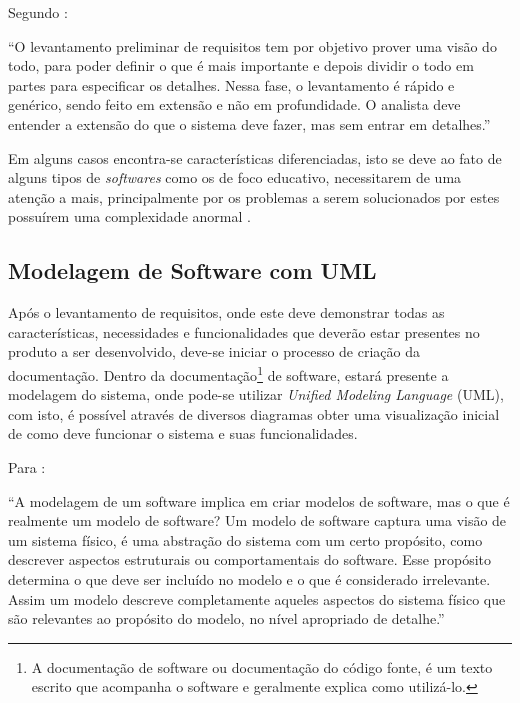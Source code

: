 \documentclass[
	12pt,				%
    oneside,			%
	a4paper,			%
	english,			%
	french,				%
	spanish,			%
	brazil,				%
	]{abntex2}
\begin{document}
	Segundo :
	
	\begin{citacao}
		“O levantamento preliminar de requisitos tem por objetivo prover uma visão do todo, para poder definir o que é mais importante e depois dividir o todo em partes para especificar os detalhes. Nessa fase, o levantamento é rápido e genérico, sendo feito em extensão e não em profundidade. O analista deve entender a extensão do que o sistema deve fazer, mas sem entrar em detalhes.”
	\end{citacao}
	
	Em alguns casos encontra-se características diferenciadas, isto se deve ao fato de alguns tipos de \textit{softwares} como os de foco educativo, necessitarem de uma atenção a mais, principalmente por os problemas a serem solucionados por estes possuírem uma complexidade anormal .
	
	\subsection{Modelagem de Software com UML}
	
	Após o levantamento de requisitos, onde este deve demonstrar todas as características, necessidades e funcionalidades que deverão estar presentes no produto a ser desenvolvido, deve-se iniciar o processo de criação da documentação. Dentro da documentação\footnote{A documentação de software ou documentação do código fonte, é um texto escrito que acompanha o software e geralmente explica como utilizá-lo.} de software, estará presente a modelagem do sistema, onde pode-se utilizar \textit{Unified Modeling Language} (UML), com isto, é possível através de diversos diagramas obter uma visualização inicial de como deve funcionar o sistema e suas funcionalidades.
	
	Para :
	\begin{citacao} 
		“A modelagem de um software implica em criar modelos de software, mas o que é realmente um modelo de software? Um modelo de software captura uma visão de um sistema físico, é uma abstração do sistema com um certo propósito, como descrever aspectos estruturais ou comportamentais do software. Esse propósito determina o que deve ser incluído no modelo e o que é considerado irrelevante. Assim um modelo descreve completamente aqueles aspectos do sistema físico que são relevantes ao propósito do modelo, no nível apropriado de detalhe.”
	\end{citacao}
	
\end{document}
